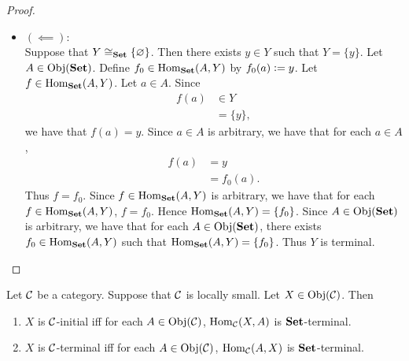 \documentclass{book}
\begin{document}
\begin{proof}
\begin{enumerate}
\begin{itemize}
				\begin{align*}
					\# \Hom_{\bSet}(\{\varnothing\}, Y) = 1
					& \iff \# Y = 1 \\
					& \iff Y \cong_{\bSet} \{\varnothing\}.
				\end{align*}
				Since $Y$ is terminal, there exists $f \in \Hom_{\bSet}(\{\varnothing\}, Y)$ such that $\Hom_{\bSet}(\{\varnothing\}, Y) = \{f\}$. Thus $Y \cong_{\bSet} \{\varnothing\}$.
				\item $(\impliedby)$: \\
				Suppose that $Y \cong_{\bSet} \{\varnothing\}$. Then there exists $y \in Y$ such that $Y = \{y\}$. Let $A \in \operatorname{Obj}(\text{\textbf{Set}})$. Define $f_0 \in \operatorname{Hom}_{\text{\textbf{Set}}}(A, Y)$ by $f_0(a) \vcentcolon= y$. Let $f \in \operatorname{Hom}_{\text{\textbf{Set}}}(A, Y)$. Let $a \in A$. Since 
				\begin{align*}
					f(a) 
					& \in Y \\
					& = \{y\}, 
				\end{align*}
				we have that $f(a) = y$. Since $a \in A$ is arbitrary, we have that for each $a \in A$, 
				\begin{align*}
					f(a) 
					& = y \\
					& = f_0(a). 
				\end{align*}
				Thus $f = f_0$. Since $f \in \operatorname{Hom}_{\text{\textbf{Set}}}(A, Y)$ is arbitrary, we have that for each $f \in \operatorname{Hom}_{\text{\textbf{Set}}}(A, Y)$, $f = f_0$. Hence $\operatorname{Hom}_{\text{\textbf{Set}}}(A, Y) = \{f_0\}$. Since $A \in \operatorname{Obj}(\text{\textbf{Set}})$ is arbitrary, we have that for each $A \in \operatorname{Obj}(\text{\textbf{Set}})$, there exists $f_0 \in \operatorname{Hom}_{\text{\textbf{Set}}}(A, Y)$ such that $\operatorname{Hom}_{\text{\textbf{Set}}}(A, Y) = \{f_0\}$. Thus $Y$ is terminal. 
			\end{itemize}
		\end{enumerate}
	\end{proof}
	
	\begin{ex} 
		Let $\mathcal{C}$ be a category. Suppose that $\mathcal{C}$ is locally small. Let $X \in \operatorname{Obj}(\mathcal{C})$. Then 
		\begin{enumerate}
			\item $X$ is $\mathcal{C}$-initial iff for each $A \in \operatorname{Obj}(\mathcal{C})$, $\operatorname{Hom}_{\mathcal{C}}(X, A)$ is $\text{\textbf{Set}}$-terminal.
			\item $X$ is $\mathcal{C}$-terminal iff for each $A \in \operatorname{Obj}(\mathcal{C})$, $\operatorname{Hom}_{\mathcal{C}}(A, X)$ is $\text{\textbf{Set}}$-terminal.
		\end{enumerate}
	\end{ex}
	
\end{document}
